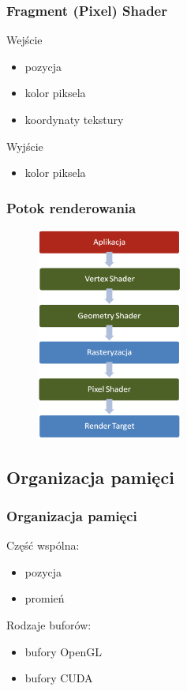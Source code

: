 \documentclass{beamer}
\begin{document}
\frame
{
	\frametitle{Fragment (Pixel) Shader}

	\begin{block}{Wejście}
	\begin{itemize}
	\item pozycja
	\item kolor piksela
	\item koordynaty tekstury
	\end{itemize}
	\end{block}
	\begin{block}{Wyjście}
	\begin{itemize}
	\item kolor piksela
	\end{itemize}
	\end{block}
}

\frame
{
	\frametitle{Potok renderowania}
	\begin{figure}
	\centering
	\includegraphics[height=7cm]{img/potok.png}
	\label{fig:potok}
	\end{figure}

}

\subsection{Organizacja pamięci}\label{sub:organizacja pamięci}

\frame
{
	\frametitle{Organizacja pamięci}

	Część wspólna:
	\begin{itemize}
	\item pozycja
	\item promień
	\end{itemize}

	\pause
	Rodzaje buforów:

	\begin{itemize}
	\item bufory OpenGL
	\item bufory CUDA
	\end{itemize}

}
\end{document}

